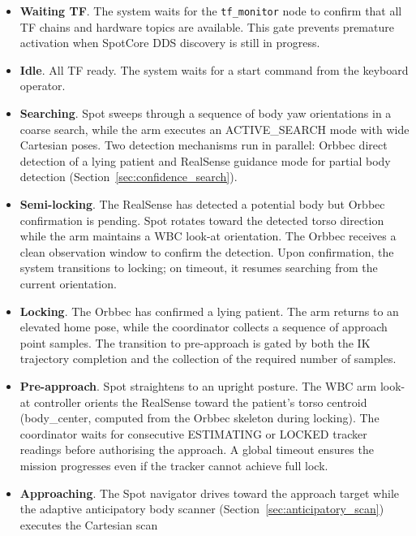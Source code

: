 \begin{itemize}
  \item \textbf{Waiting TF}. The system waits for the \texttt{tf\_monitor}
        node to confirm that all \ac{TF} chains and hardware topics are
        available. This gate prevents premature activation when SpotCore
        \ac{DDS} discovery is still in progress.
  \item \textbf{Idle}. All \ac{TF} ready. The system waits for a start
        command from the keyboard operator.
  \item \textbf{Searching}. Spot sweeps through a sequence of body yaw
        orientations in a coarse search, while the arm executes an
        ACTIVE\_SEARCH mode with wide Cartesian poses. Two detection
        mechanisms run in parallel: Orbbec direct detection of a lying
        patient and RealSense guidance mode for partial body detection
        (Section~\ref{sec:confidence_search}).
  \item \textbf{Semi-locking}. The RealSense has detected a potential
        body but Orbbec confirmation is pending. Spot rotates toward the
        detected torso direction while the arm maintains a \ac{WBC} look-at
        orientation. The Orbbec receives a clean observation window to
        confirm the detection. Upon confirmation, the system transitions to
        locking; on timeout, it resumes searching from the current
        orientation.
  \item \textbf{Locking}. The Orbbec has confirmed a lying patient. The arm
        returns to an elevated home pose, while the coordinator collects
        a sequence of approach point samples. The transition to
        pre-approach is gated by both the \ac{IK} trajectory completion
        and the collection of the required number of samples.
  \item \textbf{Pre-approach}. Spot straightens to an upright posture.
        The \ac{WBC} arm look-at controller orients the RealSense toward
        the patient's torso centroid (body\_center, computed from the Orbbec
        skeleton during locking). The coordinator waits for consecutive
        ESTIMATING or LOCKED tracker readings before authorising the
        approach. A global timeout ensures the mission progresses even if
        the tracker cannot achieve full lock.
  \item \textbf{Approaching}. The Spot navigator drives toward the approach
        target while the adaptive anticipatory body scanner
        (Section~\ref{sec:anticipatory_scan}) executes the Cartesian scan

\end{itemize}
